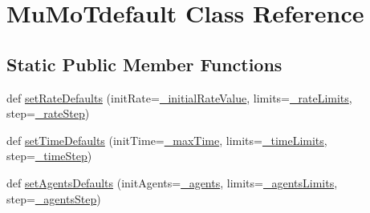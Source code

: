 \hypertarget{class_mu_mo_t_1_1_mu_mo_tdefault}{}\section{Mu\+Mo\+Tdefault Class Reference}
\label{class_mu_mo_t_1_1_mu_mo_tdefault}
\subsection*{Static Public Member Functions}
\begin{DoxyCompactItemize}
\item 
def \hyperlink{class_mu_mo_t_1_1_mu_mo_tdefault_a3ce665e68925e7c173896a5101b16dfa}{set\+Rate\+Defaults} (init\+Rate=\hyperlink{class_mu_mo_t_1_1_mu_mo_tdefault_adbfda01292fc4c7936ed57523fd625c7}{\+\_\+initial\+Rate\+Value}, limits=\hyperlink{class_mu_mo_t_1_1_mu_mo_tdefault_a89f788e3d778e1e0554c57832275d484}{\+\_\+rate\+Limits}, step=\hyperlink{class_mu_mo_t_1_1_mu_mo_tdefault_aa45ec6be070d9881c9c018a533f6573c}{\+\_\+rate\+Step})
\item 
def \hyperlink{class_mu_mo_t_1_1_mu_mo_tdefault_a4be4721ce31fd644cb66ae8af0dd41fe}{set\+Time\+Defaults} (init\+Time=\hyperlink{class_mu_mo_t_1_1_mu_mo_tdefault_a46ffe9aa10cdab976a57d8ba1d3cd2f6}{\+\_\+max\+Time}, limits=\hyperlink{class_mu_mo_t_1_1_mu_mo_tdefault_a2208809031da7f126f4416fb64cdb026}{\+\_\+time\+Limits}, step=\hyperlink{class_mu_mo_t_1_1_mu_mo_tdefault_ad83203bcc6032b30e6f5b57f8982af9e}{\+\_\+time\+Step})
\item 
def \hyperlink{class_mu_mo_t_1_1_mu_mo_tdefault_a390063ec9e63f433bf06fa72f608b7e4}{set\+Agents\+Defaults} (init\+Agents=\hyperlink{class_mu_mo_t_1_1_mu_mo_tdefault_a42f05ec35f2b5b564e064bb19ebd36cf}{\+\_\+agents}, limits=\hyperlink{class_mu_mo_t_1_1_mu_mo_tdefault_a01360abcb6eddb212c38b66852c35e17}{\+\_\+agents\+Limits}, step=\hyperlink{class_mu_mo_t_1_1_mu_mo_tdefault_a55b7c54066a90600796a35e96ef5743b}{\+\_\+agents\+Step})
\end{DoxyCompactItemize}
